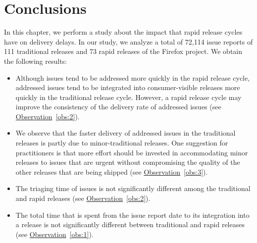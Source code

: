 \section{Conclusions} \label{sec:conclusion}

In this chapter, we perform a study about the impact that
rapid release cycles have on delivery delays. In our study, we analyze
a total of 72,114 issue reports of 111 traditional releases and 73 rapid
releases of the Firefox project. We obtain the following results:

\begin{itemize}

	\item Although issues tend to be addressed more quickly in the rapid
		release cycle, addressed issues tend to be integrated into
		consumer-visible releases more quickly in the traditional
		release cycle. However, a rapid release cycle may improve the
		consistency of the delivery rate of addressed issues (see
		\hyperref[obs:2]{Observation}~\ref{obs:2}).
	
	\item We observe that the faster delivery of addressed issues in the
		traditional releases is partly due to minor-traditional
		releases. One suggestion for practitioners is that more effort
		should be invested in accommodating minor releases to issues
		that are urgent without compromising the quality of the other
		releases that are being shipped (see
		\hyperref[obs:3]{Observation}~\ref{obs:3}).

	\item The triaging time of issues is not significantly different among
		the traditional and rapid releases (see
		\hyperref[obs:2]{Observation}~\ref{obs:2}).

	\item The total time that is spent from the issue report date to its
		integration into a release is not significantly different
		between traditional and rapid releases (see
		\hyperref[obs:1]{Observation}~\ref{obs:1}).


\end{itemize}
